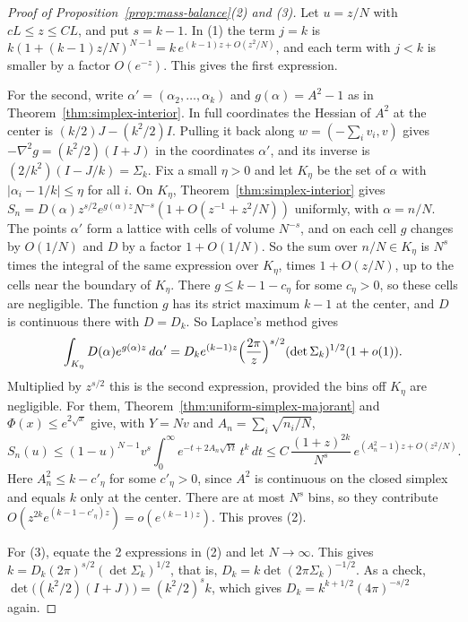 \begin{proof}[Proof of Proposition~\ref{prop:mass-balance}(2) and (3)]
Let $u=z/N$ with $cL\le z\le CL$, and put $s=k-1$. In (1) the term $j=k$ is
$k(1+(k-1)z/N)^{N-1}=k\,e^{(k-1)z+O(z^2/N)}$, and each term with $j<k$ is smaller
by a factor $O(e^{-z})$. This gives the first expression.

For the second, write $\alpha'=(\alpha_2,\ldots,\alpha_k)$ and $g(\alpha)=A^2-1$ as
in Theorem~\ref{thm:simplex-interior}. In full coordinates the Hessian of $A^2$ at
the center is $(k/2)J-(k^2/2)I$. Pulling it back along $w=(-\sum_iv_i,v)$ gives
$-\nabla^2g=(k^2/2)(I+J)$ in the coordinates $\alpha'$, and its inverse is
$(2/k^2)(I-J/k)=\Sigma_k$. Fix a small $\eta>0$ and let $K_\eta$ be the set of
$\alpha$ with $|\alpha_i-1/k|\le\eta$ for all $i$. On $K_\eta$,
Theorem~\ref{thm:simplex-interior} gives
$S_n=D(\alpha)z^{s/2}e^{g(\alpha)z}N^{-s}(1+O(z^{-1}+z^2/N))$ uniformly, with
$\alpha=n/N$. The points $\alpha'$ form a lattice with cells of volume $N^{-s}$,
and on each cell $g$ changes by $O(1/N)$ and $D$ by a factor $1+O(1/N)$. So the
sum over $n/N\in K_\eta$ is $N^s$ times the integral of the same expression over
$K_\eta$, times $1+O(z/N)$, up to the cells near the boundary of $K_\eta$. There
$g\le k-1-c_\eta$ for some $c_\eta>0$, so these cells are negligible. The function
$g$ has its strict maximum $k-1$ at the center, and $D$ is continuous there with
$D=D_k$. So Laplace's method gives
\[
\int_{K_\eta}D(\alpha)e^{g(\alpha)z}\,d\alpha'
=D_ke^{(k-1)z}\Bigl(\frac{2\pi}z\Bigr)^{s/2}(\det\Sigma_k)^{1/2}(1+o(1)).
\]
Multiplied by $z^{s/2}$ this is the second expression, provided the bins off
$K_\eta$ are negligible. For them, Theorem~\ref{thm:uniform-simplex-majorant} and
$\Phi(x)\le e^{2\sqrt x}$ give, with $Y=Nv$ and $A_n=\sum_i\sqrt{n_i/N}$,
\[
S_n(u)\le(1-u)^{N-1}v^s\int_0^\infty e^{-t+2A_n\sqrt{Yt}}\,t^k\,dt
\le C\,\frac{(1+z)^{2k}}{N^s}\,e^{(A_n^2-1)z+O(z^2/N)} .
\]
Here $A_n^2\le k-c'_\eta$ for some $c'_\eta>0$, since $A^2$ is continuous on the
closed simplex and equals $k$ only at the center. There are at most $N^s$ bins,
so they contribute $O(z^{2k}e^{(k-1-c'_\eta)z})=o(e^{(k-1)z})$. This proves (2).

For (3), equate the 2 expressions in (2) and let $N\to\infty$. This gives
$k=D_k(2\pi)^{s/2}(\det\Sigma_k)^{1/2}$, that is, $D_k=k\det(2\pi\Sigma_k)^{-1/2}$.
As a check, $\det\bigl((k^2/2)(I+J)\bigr)=(k^2/2)^sk$, which gives
$D_k=k^{k+1/2}(4\pi)^{-s/2}$ again.
\end{proof}

